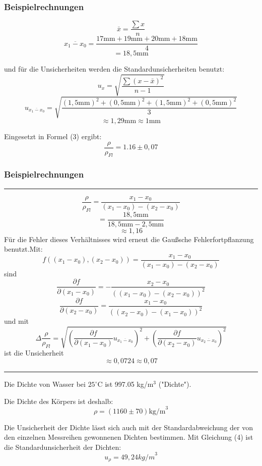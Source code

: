 \documentclass[11pt,a4paper]{article} %
\begin{document}
\subsubsection{Beispielrechnungen}
\begin{tcolorbox}[colback=white]
$$\bar{x}=\frac{\sum x}{n}$$
$$\overline{x_1-x_0}=\frac{17\textrm{mm}+19\textrm{mm}+20\textrm{mm}+18\textrm{mm}}{4}$$
$$=18,5\textrm{mm}$$

und für die Unsicherheiten werden die Standardunsicherheiten benutzt:
\begin{equation}
u_{x}=\sqrt{\frac{\sum(x-\bar{x})^2}{n-1}}
\end{equation}
$$u_{\overline{x_1-x_0}}=\sqrt{\frac{(1,5\textrm{mm})^2+(0,5\textrm{mm})^2+(1,5\textrm{mm})^2+(0,5\textrm{mm})^2}{3}}$$
$$\approx1,29\textrm{mm}\approx1\textrm{mm}$$
\end{tcolorbox}
\vspace{5mm}

Eingesetzt in Formel (3) ergibt:
$$\frac{\rho}{\rho_{Fl}} = 1.16 \pm0,07$$

\subsubsection{Beispielrechnungen}
\hrule
\begin{tcolorbox}[colback=white]
$$\frac{\rho}{\rho_{Fl}} = \frac{x_1-x_0}{(x_1-x_0)-(x_2-x_0)}$$
$$=\frac{18,5\textrm{mm}}{18,5\textrm{mm}-2,5\textrm{mm}}$$
$$\approx1,16$$
Für die Fehler dieses Verhältnisses wird erneut die Gaußsche Fehlerfortpflanzung benutzt.Mit:
$$f((x_1-x_0),(x_2-x_0))=\frac{x_1-x_0}{(x_1-x_0)-(x_2-x_0)}$$
sind
$$\frac{\partial f}{\partial (x_1-x_0)}=-\dfrac{x_2-x_0}{\left((x_1-x_0)-(x_2-x_0)\right)^2}$$
$$\frac{\partial f}{\partial (x_2-x_0)}=\dfrac{x_1-x_0}{\left((x_2-x_0)-(x_1-x_0)\right)^2}$$
und mit
$$\Delta{\frac{\rho}{\rho_{Fl}}}=\sqrt{(\frac{\partial f}{\partial (x_1-x_0)}u_{\overline{x_1-x_0}})^2+(\frac{\partial f}{\partial (x_2-x_0)}u_{\overline{x_2-x_0}})^2}$$
ist die Unsicherheit
$$\approx0,0724\approx0,07$$
\end{tcolorbox}
\hrule
\vspace{5mm}

Die Dichte von Wasser bei $25^\circ$C ist 997.05 kg/m$^3$ ("Dichte").

Die Dichte des Körpers ist deshalb:
$$\rho=(1160\pm70) \textrm{kg/m}^3$$

Die Unsicherheit der Dichte lässt sich auch mit der Standardabweichung der von den einzelnen Messreihen gewonnenen Dichten bestimmen.
Mit Gleichung (4) ist die Standardunsicherheit der Dichten:
$$u_\rho=49,24{kg/m}^3$$
\end{document}
